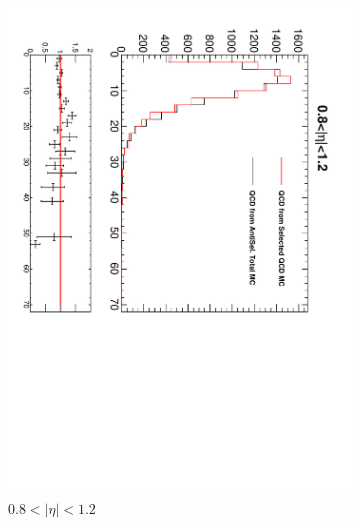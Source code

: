 \begin{figure}[htbp]
\begin{subfigure}{0.45\textwidth}
    \includegraphics*[trim = 0mm 0mm 15mm 0mm, clip, width=\textwidth, angle=90]{MetCompare_anti_eta3.pdf}
    \caption{$0.8<| \eta |<1.2$}
    \label{fig:qcd_met_eta3}
  \end{subfigure}
  \begin{subfigure}{0.45\textwidth}
    \centering

\end{subfigure}
\end{figure}
